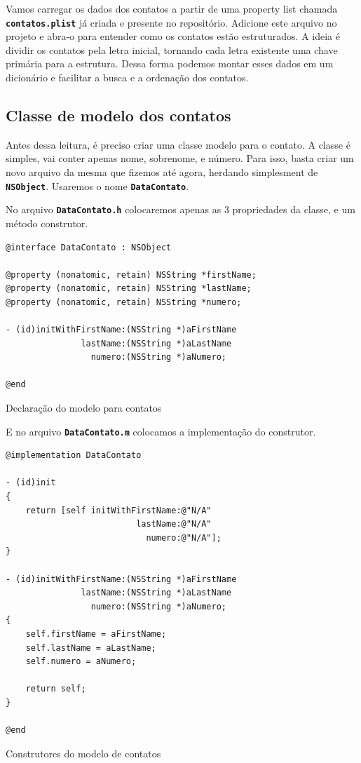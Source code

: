\documentclass[a4paper,12pt,brazil,oneside]{book}
\begin{document}
Vamos carregar os dados dos contatos a partir de uma property list chamada \texttt{\textbf{contatos.plist}} já criada e presente no repositório. Adicione este arquivo no projeto e abra-o para entender como os contatos estão estruturados. A ideia é dividir os contatos pela letra inicial, tornando cada letra existente uma chave primária para a estrutura. Dessa forma podemos montar esses dados em um dicionário e facilitar a busca e a ordenação dos contatos.

\subsection{Classe de modelo dos contatos}


Antes dessa leitura, é preciso criar uma classe modelo para o contato. A classe é simples, vai conter apenas nome, sobrenome, e número. Para isso, basta criar um novo arquivo da mesma que fizemos até agora, herdando simplesment de \texttt{\textbf{NSObject}}. Usaremos o nome \texttt{\textbf{DataContato}}.

No arquivo \texttt{\textbf{DataContato.h}} colocaremos apenas as 3 propriedades da classe, e um método construtor.

\begin{listing}[H]
\begin{verbatim}
@interface DataContato : NSObject

@property (nonatomic, retain) NSString *firstName;
@property (nonatomic, retain) NSString *lastName;
@property (nonatomic, retain) NSString *numero;

- (id)initWithFirstName:(NSString *)aFirstName
               lastName:(NSString *)aLastName
                 numero:(NSString *)aNumero;

@end
\end{verbatim}
\caption{Declaração do modelo para contatos}
\end{listing}


E no arquivo \texttt{\textbf{DataContato.m}} colocamos a implementação do construtor.

\begin{listing}[H]
\begin{verbatim}
@implementation DataContato

- (id)init
{
    return [self initWithFirstName:@"N/A"
                          lastName:@"N/A"
                            numero:@"N/A"];
}

- (id)initWithFirstName:(NSString *)aFirstName
               lastName:(NSString *)aLastName
                 numero:(NSString *)aNumero;
{    
    self.firstName = aFirstName;
    self.lastName = aLastName;
    self.numero = aNumero;
    
    return self;
}

@end
\end{verbatim}
\caption{Construtores do modelo de contatos}
\end{listing}
\end{document}
